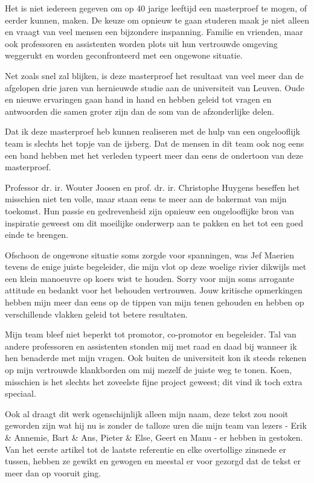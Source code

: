 
\begin{preface}

Het is niet iedereen gegeven om op 40 jarige leeftijd een masterproef te mogen,
of eerder kunnen, maken. De keuze om opnieuw te gaan studeren maak je niet
alleen en vraagt van veel mensen een bijzondere inspanning. Familie en
vrienden, maar ook professoren en assistenten worden plots uit hun vertrouwde
omgeving weggerukt en worden geconfronteerd met een ongewone situatie.

Net zoals snel zal blijken, is deze masterproef het resultaat van veel meer dan
de afgelopen drie jaren van hernieuwde studie aan de universiteit van Leuven.
Oude en nieuwe ervaringen gaan hand in hand en hebben geleid tot vragen en
antwoorden die samen groter zijn dan de som van de afzonderlijke delen.

Dat ik deze masterproef heb kunnen realiseren met de hulp van een ongelooflijk
team is slechts het topje van de ijsberg. Dat de mensen in dit team ook nog
eens een band hebben met het verleden typeert meer dan eens de ondertoon van
deze masterproef.

Professor dr. ir. Wouter Joosen en prof. dr. ir. Christophe Huygens beseffen
het misschien niet ten volle, maar staan eens te meer aan de bakermat van mijn
toekomst. Hun passie en gedrevenheid zijn opnieuw een ongelooflijke bron van
inspiratie geweest om dit moeilijke onderwerp aan te pakken en het tot een goed
einde te brengen.

Ofschoon de ongewone situatie soms zorgde voor spanningen, was Jef Maerien
tevens de enige juiste begeleider, die mijn vlot op deze woelige rivier
dikwijls met een klein manoeuvre op koers wist te houden. Sorry voor mijn soms
arrogante attitude en bedankt voor het behouden vertrouwen. Jouw kritische
opmerkingen hebben mijn meer dan eens op de tippen van mijn tenen gehouden en
hebben op verschillende vlakken geleid tot betere resultaten.

Mijn team bleef niet beperkt tot promotor, co-promotor en begeleider. Tal van
andere professoren en assistenten stonden mij met raad en daad bij wanneer ik
hen benaderde met mijn vragen. Ook buiten de universiteit kon ik steeds rekenen
op mijn vertrouwde klankborden om mij mezelf de juiste weg te tonen. Koen,
misschien is het slechts het zoveelste fijne project geweest; dit vind ik toch
extra speciaal.

Ook al draagt dit werk ogenschijnlijk alleen mijn naam, deze tekst zou nooit
geworden zijn wat hij nu is zonder de talloze uren die mijn team van lezers -
Erik \& Annemie, Bart \& Ans, Pieter \& Else, Geert en Manu - er hebben in
gestoken. Van het eerste artikel tot de laatste referentie en elke overtollige
zinsnede er tussen, hebben ze gewikt en gewogen en meestal er voor gezorgd dat
de tekst er meer dan op vooruit ging.


\end{preface}
